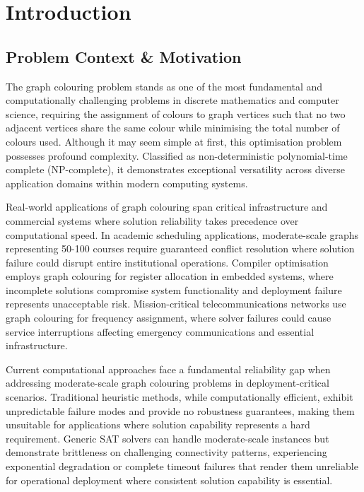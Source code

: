 \section{Introduction}

\subsection{Problem Context \& Motivation}

The graph colouring problem stands as one of the most fundamental and computationally challenging problems in discrete mathematics and computer science, requiring the assignment of colours to graph vertices such that no two adjacent vertices share the same colour while minimising the total number of colours used. Although it may seem simple at first, this optimisation problem possesses profound complexity. Classified as non-deterministic polynomial-time complete (NP-complete), it demonstrates exceptional versatility across diverse application domains within modern computing systems.

Real-world applications of graph colouring span critical infrastructure and commercial systems where solution reliability takes precedence over computational speed. In academic scheduling applications, moderate-scale graphs representing 50-100 courses require guaranteed conflict resolution where solution failure could disrupt entire institutional operations. Compiler optimisation employs graph colouring for register allocation in embedded systems, where incomplete solutions compromise system functionality and deployment failure represents unacceptable risk. Mission-critical telecommunications networks use graph colouring for frequency assignment, where solver failures could cause service interruptions affecting emergency communications and essential infrastructure.

Current computational approaches face a fundamental reliability gap when addressing moderate-scale graph colouring problems in deployment-critical scenarios. Traditional heuristic methods, while computationally efficient, exhibit unpredictable failure modes and provide no robustness guarantees, making them unsuitable for applications where solution capability represents a hard requirement. Generic SAT solvers can handle moderate-scale instances but demonstrate brittleness on challenging connectivity patterns, experiencing exponential degradation or complete timeout failures that render them unreliable for operational deployment where consistent solution capability is essential.

